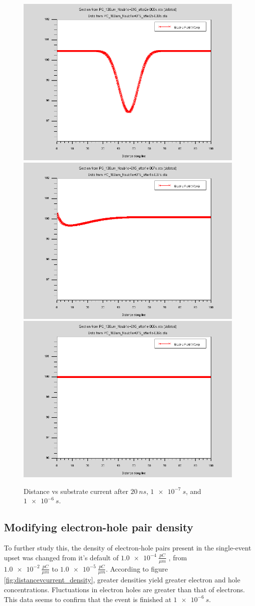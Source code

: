 \documentclass[12pt]{article}
\begin{document}
\begin{figure}[htp]
  \centering
  \includegraphics[width=.3\textwidth]{PC_100um_Nsub1e+015_after2e-008s}\hfill
  \includegraphics[width=.3\textwidth]{PC_100um_Nsub1e+015_after1e-007s}\hfill
  \includegraphics[width=.3\textwidth]{PC_100um_Nsub1e+015_after1e-006s}
  \caption{Distance vs substrate current after $\SI{20}{ns}$, $\SI{1e-7}{s}$, and $\SI{1e-6}{s}$.}
  \label{fig:distancevcurrent}
\end{figure}

\subsection{Modifying electron-hole pair density}
To further study this, the density of electron-hole pairs present in the single-event upset was changed from it's default of $\SI{1.0e-4}{\frac{pC}{{\mu}m}}$ , from \\$\SI{1.0e-2}{\frac{pC}{{\mu}m}}$ to $\SI{1.0e-5}{\frac{pC}{{\mu}m}}$. According to figure \ref{fig:distancevcurrent_density}, greater densities yield greater electron and hole concentrations. Fluctuations in electron holes are greater than that of electrons. This data seems to confirm that the event is finished at $\SI{1e-6}{s}$.
\end{document}
